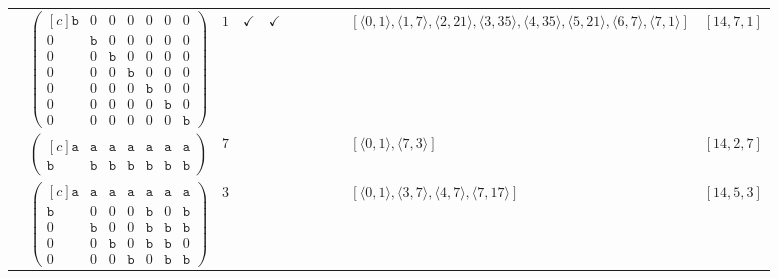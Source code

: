 \documentclass[12pt]{article}
\theoremstyle{definition}
\theoremstyle{plain}
\begin{document}
{\begin{longtable}{@{}cYcccccccZc@{}}
\cmidrule(lr){2-11}

& $\begin{pmatrix*}[c]
\mathtt{b}   &  0    &  0    &   0  &  0  &  0  &  0  \\
0   &  \mathtt{b}    &  0    &   0  &  0  &  0  &  0  \\
0   &  0    &  \mathtt{b}    &   0  &  0  &  0  &  0  \\
0   &  0    &  0    &   \mathtt{b}  &  0  &  0  &  0  \\
0   &  0    &  0    &   0  &  \mathtt{b}  &  0  &  0  \\
0   &  0    &  0    &   0  &  0  &  \mathtt{b}  &  0  \\
0   &  0    &  0    &   0  &  0  &  0  &  \mathtt{b}
\end{pmatrix*}$
& $1$
& $\checkmark$
& $\checkmark$
&
&
&
&
& $[\langle0,1\rangle,\allowbreak\langle1,7\rangle,\allowbreak\langle2,21\rangle,\allowbreak\langle3,35\rangle,\allowbreak\langle4,35\rangle,\allowbreak\langle5,21\rangle,\allowbreak\langle6,7\rangle,\allowbreak\langle7,1\rangle]$
& $[14,7,1]$     \\

\cmidrule(lr){2-11}

\vspace*{5pt}


& $\begin{pmatrix*}[c]
\mathtt{a}   &  \mathtt{a}    &  \mathtt{a}    &   \mathtt{a}  &  \mathtt{a}  &  \mathtt{a}  &  \mathtt{a}  \\
\mathtt{b}   &  \mathtt{b}    &  \mathtt{b}    &   \mathtt{b}  &  \mathtt{b}  &  \mathtt{b}  &  \mathtt{b}
\end{pmatrix*}$
& $7$
&
&
&
&
&
&
& $[\langle0,1\rangle,\allowbreak\langle7,3\rangle]$
& $[14,2,7]$     \\[-5pt]

\cmidrule(lr){2-11}

& $\begin{pmatrix*}[c]
\mathtt{a}   &  \mathtt{a}    &  \mathtt{a}    &   \mathtt{a}  &  \mathtt{a}  &  \mathtt{a}  &  \mathtt{a}  \\
\mathtt{b}   &  0    &  0    &   0  &  \mathtt{b}  &  0  &  \mathtt{b}  \\
0   &  \mathtt{b}    &  0    &   0  &  \mathtt{b}  &  \mathtt{b}  &  \mathtt{b}  \\
0   &  0    &  \mathtt{b}    &   0  &  \mathtt{b}  &  \mathtt{b}  &  0  \\
0   &  0    &  0    &   \mathtt{b}  &  0  &  \mathtt{b}  &  \mathtt{b}
\end{pmatrix*}$
& $3$
&
&
&
&
&
&
& $[\langle0,1\rangle,\allowbreak\langle3,7\rangle,\allowbreak\langle4,7\rangle,\allowbreak\langle7,17\rangle]$
& $[14,5,3]$    \\


\end{longtable}}
\end{document}
